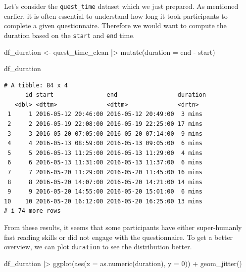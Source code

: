 \documentclass[
  letterpaper,
  DIV=11,
  numbers=noendperiod]{scrreprt}
\newenvironment{Shaded}{\begin{snugshade}}{\end{snugshade}}
\newcommand{\AttributeTok}[1]{\textcolor[rgb]{0.40,0.45,0.13}{#1}}
\newcommand{\DecValTok}[1]{\textcolor[rgb]{0.68,0.00,0.00}{#1}}
\newcommand{\FunctionTok}[1]{\textcolor[rgb]{0.28,0.35,0.67}{#1}}
\newcommand{\NormalTok}[1]{\textcolor[rgb]{0.00,0.23,0.31}{#1}}
\newcommand{\OtherTok}[1]{\textcolor[rgb]{0.00,0.23,0.31}{#1}}
\newcommand{\SpecialCharTok}[1]{\textcolor[rgb]{0.37,0.37,0.37}{#1}}
\begin{document}
Let's consider the \texttt{quest\_time} dataset which we just prepared.
As mentioned earlier, it is often essential to understand how long it
took participants to complete a given questionnaire. Therefore we would
want to compute the duration based on the \texttt{start} and
\texttt{end} time.

\begin{Shaded}
\begin{Highlighting}[]
\NormalTok{df\_duration }\OtherTok{\textless{}{-}}
\NormalTok{  quest\_time\_clean }\SpecialCharTok{|\textgreater{}}
  \FunctionTok{mutate}\NormalTok{(}\AttributeTok{duration =}\NormalTok{ end }\SpecialCharTok{{-}}\NormalTok{ start)}

\NormalTok{df\_duration}
\end{Highlighting}
\end{Shaded}

\begin{verbatim}
# A tibble: 84 x 4
      id start               end                 duration
   <dbl> <dttm>              <dttm>              <drtn>  
 1     1 2016-05-12 20:46:00 2016-05-12 20:49:00  3 mins 
 2     2 2016-05-19 22:08:00 2016-05-19 22:25:00 17 mins 
 3     3 2016-05-20 07:05:00 2016-05-20 07:14:00  9 mins 
 4     4 2016-05-13 08:59:00 2016-05-13 09:05:00  6 mins 
 5     5 2016-05-13 11:25:00 2016-05-13 11:29:00  4 mins 
 6     6 2016-05-13 11:31:00 2016-05-13 11:37:00  6 mins 
 7     7 2016-05-20 11:29:00 2016-05-20 11:45:00 16 mins 
 8     8 2016-05-20 14:07:00 2016-05-20 14:21:00 14 mins 
 9     9 2016-05-20 14:55:00 2016-05-20 15:01:00  6 mins 
10    10 2016-05-20 16:12:00 2016-05-20 16:25:00 13 mins 
# i 74 more rows
\end{verbatim}

From these results, it seems that some participants have either
super-humanly fast reading skills or did not engage with the
questionnaire. To get a better overview, we can plot \texttt{duration}
to see the distribution better.

\begin{Shaded}
\begin{Highlighting}[]
\NormalTok{df\_duration }\SpecialCharTok{|\textgreater{}}
  \FunctionTok{ggplot}\NormalTok{(}\FunctionTok{aes}\NormalTok{(}\AttributeTok{x =} \FunctionTok{as.numeric}\NormalTok{(duration),}
             \AttributeTok{y =} \DecValTok{0}\NormalTok{)) }\SpecialCharTok{+}
  \FunctionTok{geom\_jitter}\NormalTok{()}
\end{Highlighting}
\end{Shaded}
\end{document}
